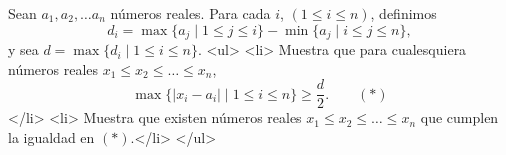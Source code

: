 Sean $a_1, a_2, \dots a_n$ números reales. Para cada $i$, $ (1 \leq i \leq n )$, definimos 
\[ d_{i} = \max \{ a_{j}\mid 1 \leq j \leq i \} - \min \{ a_{j}\mid i \leq j \leq n \}, \]
y sea $d = \max \{d_{i}\mid 1 \leq i \leq n \}$.
<ul>
<li> Muestra que para cualesquiera números reales $x_1\leq x_2\leq\dots\leq x_n$, 
\[ \max \{ |x_{i} - a_{i}| \mid 1 \leq i \leq n \}\geq \frac {d}{2}. \quad \quad (*) \]</li>
<li> Muestra que existen números reales $x_1\leq x_2\leq\dots\leq x_n$ que cumplen la igualdad en $(*)$.</li>
</ul>